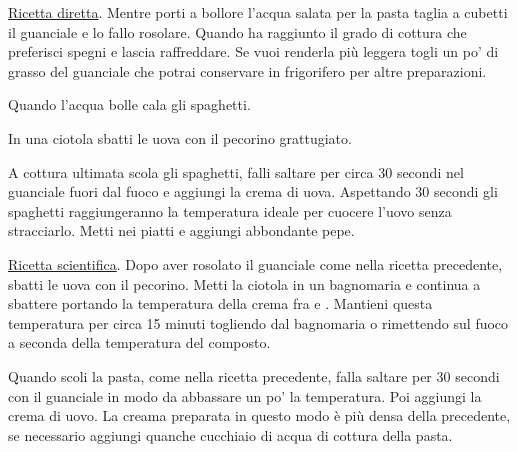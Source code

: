 \begin{method}
	\underline{Ricetta diretta}. Mentre porti a bollore l'acqua salata per la pasta taglia a cubetti il guanciale e lo fallo rosolare. Quando ha raggiunto il grado di cottura che preferisci spegni e lascia raffreddare. Se vuoi renderla più leggera togli un po' di grasso del guanciale che potrai conservare in frigorifero per altre preparazioni. 

	Quando l'acqua bolle cala gli spaghetti.

	In una ciotola sbatti le uova con il pecorino grattugiato.

	A cottura ultimata scola gli spaghetti, falli saltare per circa 30 secondi nel guanciale fuori dal fuoco e aggiungi la crema di uova. Aspettando 30 secondi gli spaghetti raggiungeranno la temperatura ideale per cuocere l'uovo senza stracciarlo. Metti nei piatti e aggiungi abbondante pepe.

	\underline{Ricetta scientifica}. Dopo aver rosolato il guanciale come nella ricetta precedente, sbatti le uova con il pecorino. Metti la ciotola in un bagnomaria e continua a sbattere portando la temperatura della crema fra  e . Mantieni questa temperatura per circa 15 minuti togliendo dal bagnomaria o rimettendo sul fuoco a seconda della temperatura del composto.

	Quando scoli la pasta, come nella ricetta precedente, falla saltare per 30 secondi con il guanciale in modo da abbassare un po' la temperatura. Poi aggiungi la crema di uovo. La creama preparata in questo modo è più densa della precedente, se necessario aggiungi quanche cucchiaio di acqua di cottura della pasta.


\end{method}




